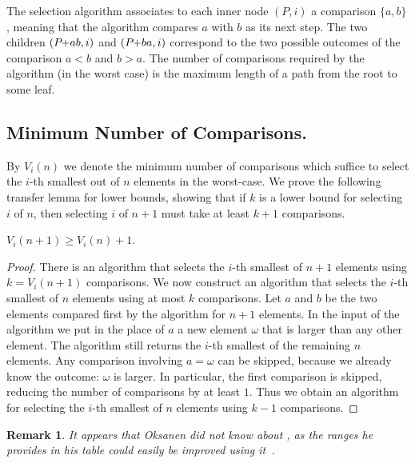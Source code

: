 \documentclass[twoside,leqno,twocolumn]{article}
\newcommand{\pchild}[3]{{#1}\kern-1pt{+}{#2}{#3}}
\newtheorem{remark}{Remark}[section]
\begin{document}
The selection algorithm associates to each inner node $(P, i)$ a comparison $\{a, b\}$, meaning that the algorithm compares $a$ with $b$ as its next step.
The two children $(\pchild{P}{a}{b}, i)$ and $(\pchild{P}{b}{a}, i)$ correspond to the two possible outcomes of the comparison $a < b$ and $b > a$.
The number of comparisons required by the algorithm (in the worst case) is the maximum length of a path from the root to some leaf.


\subsection{Minimum Number of Comparisons.}

By $V_i(n)$ we denote the minimum number of comparisons which suffice to select the $i$-th smallest out of $n$ elements in the worst-case.
We prove the following transfer lemma for lower bounds, showing that if $k$ is a lower bound for selecting $i$ of $n$, then selecting $i$ of $n + 1$ must take at least $k + 1$ comparisons.

\begin{lemma} \label{lemma:previous_next_poset}
  $V_i(n + 1) \ge V_i(n) + 1$.
\end{lemma}

\begin{proof}
  There is an algorithm that selects the $i$-th smallest of $n + 1$ elements using $k = V_i(n + 1)$ comparisons.
  We now construct an algorithm that selects the $i$-th smallest of $n$ elements using at most $k$ comparisons.
  Let $a$ and $b$ be the two elements compared first by the algorithm for $n + 1$ elements.
  In the input of the algorithm we put in the place of $a$ a new element $\omega$ that is larger than any other element.
  The algorithm still returns the $i$-th smallest of the remaining $n$ elements.
  Any comparison involving $a = \omega$ can be skipped, because we already know the outcome: $\omega$ is larger.
  In particular, the first comparison is skipped, reducing the number of comparisons by at least $1$.
  Thus we obtain an algorithm for selecting the $i$-th smallest of $n$ elements using $k - 1$ comparisons.
\end{proof}

\begin{remark}
  It appears that Oksanen did not know about , as the ranges he provides in his table could easily be improved using it~\cite{Oksanen}.
\end{remark}
\end{document}
